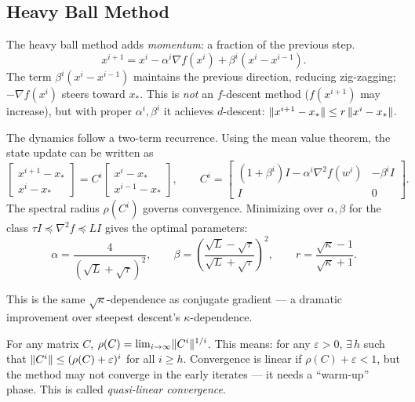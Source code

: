 \subsection{Heavy Ball Method}\label{ssec:heavy-ball}

The heavy ball method adds \textit{momentum}: a fraction of the previous step.
\begin{equation}\label{eq:heavy-ball}
	x^{i+1} = x^i - \alpha^i \nabla f(x^i) + \beta^i (x^i - x^{i-1}).
\end{equation}
The term $\beta^i(x^i - x^{i-1})$ maintains the previous direction, reducing zig-zagging; $-\nabla f(x^i)$ steers toward $x_*$.
This is \emph{not} an $f$-descent method ($f(x^{i+1})$ may increase), but with proper $\alpha^i, \beta^i$ it achieves $d$-descent: $\lVert x^{i+1} - x_*\rVert \leq r\, \lVert x^i - x_*\rVert$.

The dynamics follow a two-term recurrence.
Using the mean value theorem, the state update can be written as
\begin{equation}\label{eq:heavy-ball-state}
	\begin{bmatrix} x^{i+1} - x_* \\ x^i - x_* \end{bmatrix}
	= C^i
	\begin{bmatrix} x^i - x_* \\ x^{i-1} - x_* \end{bmatrix},
	\qquad
	C^i = \begin{bmatrix}
		(1 + \beta^i)I - \alpha^i \nabla^2 f(w^i) & -\beta^i I \\
		I & 0
	\end{bmatrix}.
\end{equation}
The spectral radius $\rho(C^i)$ governs convergence.
Minimizing over $\alpha, \beta$ for the class $\tau I \preceq \nabla^2 f \preceq LI$ gives the optimal parameters:
\begin{equation}\label{eq:heavy-ball-optimal}
	\alpha = \frac{4}{(\sqrt{L} + \sqrt{\tau})^2},
	\qquad
	\beta = \left(\frac{\sqrt{L} - \sqrt{\tau}}{\sqrt{L} + \sqrt{\tau}}\right)^{\!2},
	\qquad
	r = \frac{\sqrt{\kappa} - 1}{\sqrt{\kappa} + 1}.
\end{equation}

This is the same $\sqrt{\kappa}$-dependence as conjugate gradient --- a dramatic improvement over steepest descent's $\kappa$-dependence.

\begin{defn}\label{def:gelfand}
	For any matrix $C$, $\rho(C) = \lim_{i \to \infty} \lVert C^i\rVert^{1/i}$.
	This means: for any $\varepsilon > 0$, $\exists\, h$ such that $\lVert C^i\rVert \leq (\rho(C) + \varepsilon)^i$ for all $i \geq h$.
	Convergence is linear if $\rho(C) + \varepsilon < 1$, but the method may not converge in the early iterates --- it needs a ``warm-up'' phase.
	This is called \textit{quasi-linear convergence}.
\end{defn}

